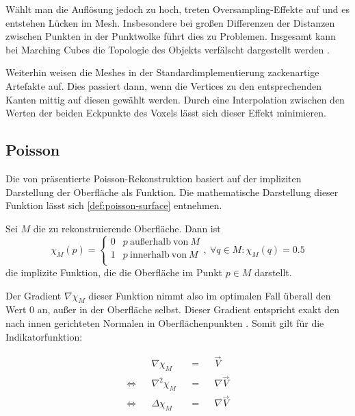 Wählt man die Auflösung jedoch zu hoch, treten Oversampling-Effekte auf und es entstehen Lücken im Mesh.
Insbesondere bei großen Differenzen der Distanzen zwischen Punkten in der Punktwolke führt dies zu Problemen.
Insgesamt kann bei Marching Cubes die Topologie des Objekts verfälscht dargestellt werden \cite[2]{chernyaev1995marching}.

Weiterhin weisen die Meshes in der Standardimplementierung zackenartige Artefakte auf.
Dies passiert dann, wenn die Vertices zu den entsprechenden Kanten mittig auf diesen gewählt werden.
Durch eine Interpolation zwischen den Werten der beiden Eckpunkte des Voxels lässt sich dieser Effekt minimieren.


\subsection{Poisson}
\label{subsec:poisson}

Die \citeyear{kazhdan2006poisson} von \citeauthor{kazhdan2006poisson} präsentierte Poisson-Rekonstruktion \cite{kazhdan2006poisson} basiert auf der impliziten Darstellung der Oberfläche als Funktion.
Die mathematische Darstellung dieser Funktion lässt sich \autoref{def:poisson-surface} entnehmen.

\begin{definition}
\label{def:poisson-surface}
Sei $M$ die zu rekonstruierende Oberfläche.
Dann ist
\begin{equation}
\chi_M(p) = \left\{
\begin{array}{ll}
0 & p\ \mathrm{außerhalb\ von}\ M\\
1 & p\ \mathrm{innerhalb\ von}\ M\\
\end{array}
\right.
,\ \forall q \in M : \chi_M(q) = 0.5
\end{equation}
die implizite Funktion, die die Oberfläche im Punkt $p \in M$ darstellt.
\end{definition}

Der Gradient $\nabla \chi_M$ dieser Funktion nimmt also im optimalen Fall überall den Wert $0$ an, außer in der Oberfläche selbst.
Dieser Gradient entspricht exakt den nach innen gerichteten Normalen in Oberflächenpunkten \cite[Abs. 3]{kazhdan2006poisson}.
Somit gilt für die Indikatorfunktion:

\begin{displaymath}
\begin{aligned}
&&\nabla \chi_M && = &&\overrightarrow{V}\\
\Leftrightarrow && \nabla^2 \chi_M && = &&\nabla \overrightarrow{V}\\
\Leftrightarrow && \Delta \chi_M && = &&\nabla \overrightarrow{V}
\end{aligned}
\end{displaymath}

